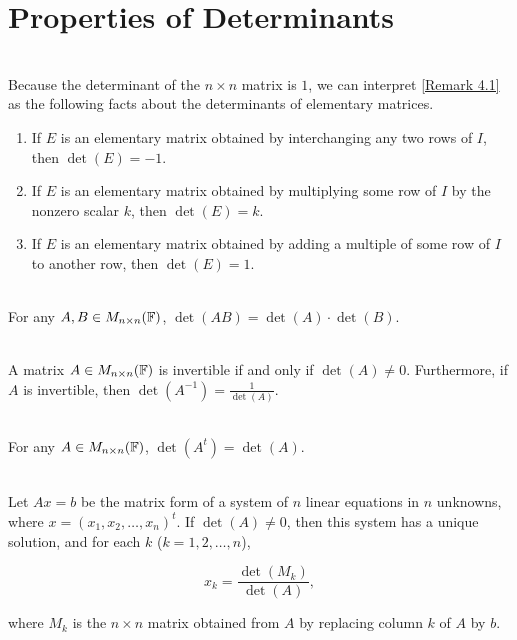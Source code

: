 \section{Properties of Determinants}

\begin{remark}
	\hfill\\
	Because the determinant of the $n \times n$ matrix is $1$, we can interpret \autoref{Remark 4.1} as the following facts about the determinants of elementary matrices.

	\begin{enumerate}
		\item If $E$ is an elementary matrix obtained by interchanging any two rows of $I$, then $\det(E) = -1$.
		\item If $E$ is an elementary matrix obtained by multiplying some row of $I$ by the nonzero scalar $k$, then $\det(E) = k$.
		\item If $E$ is an elementary matrix obtained by adding a multiple of some row of $I$ to another row, then $\det(E) = 1$.
	\end{enumerate}
\end{remark}

\begin{theorem}
	\hfill\\
	For any $A, B \in M_{n \times n}(\mathbb{F})$, $\det(AB) = \det(A) \cdot \det(B)$.
\end{theorem}

\begin{corollary}
	\hfill\\
	A matrix $A \in M_{n \times n}(\mathbb{F})$ is invertible if and only if $\det(A) \neq 0$. Furthermore, if $A$ is invertible, then $\det(A^{-1}) = \displaystyle\frac{1}{\det(A)}$.
\end{corollary}

\begin{theorem}
	\hfill\\
	For any $A \in M_{n \times n}(\mathbb{F})$, $\det(A^t)=\det(A)$.
\end{theorem}

\begin{theorem}
	\hfill\\
	Let $Ax = b$ be the matrix form of a system of $n$ linear equations in $n$ unknowns, where $x = (x_1, x_2, \dots, x_n)^t$. If $\det(A) \neq 0$, then this system has a unique solution, and for each $k$ ($k = 1, 2, \dots, n$),

	\[x_k = \frac{\det(M_k)}{\det(A)},\]

	where $M_k$ is the $n \times n$ matrix obtained from $A$ by replacing column $k$ of $A$ by $b$.
\end{theorem}

